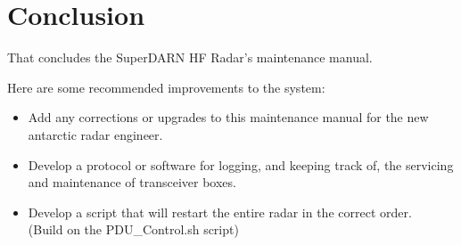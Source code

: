 \section{Conclusion}
\label{sec:conclusion}
That concludes the SuperDARN HF Radar's maintenance manual. 
\par
Here are some recommended improvements to the system:
\begin{itemize}
	\item Add any corrections or upgrades to this maintenance manual for the new antarctic radar engineer.
	\item Develop a protocol or software for logging, and keeping track of, the servicing and maintenance of transceiver boxes.
	\item Develop a script that will restart the entire radar in the correct order.\\(Build on the PDU\_Control.sh script)
\end{itemize}

\clearpage